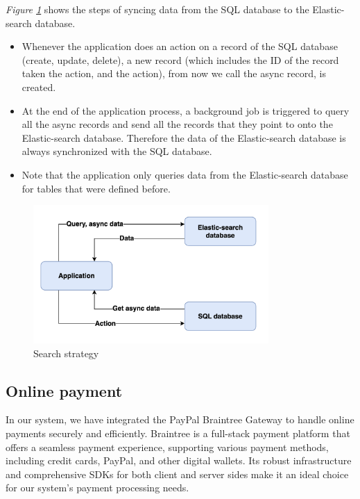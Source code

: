 \emph{Figure \ref{fig:search-strategy}} shows the steps of syncing data from the SQL database
to the Elastic-search database.

\begin{itemize}
    \item
          Whenever the application does an action on a record of the SQL
          database (create, update, delete), a new record (which includes the ID
          of the record taken the action, and the action), from now we call the
          async record, is created.
    \item
          At the end of the application process, a background job is triggered
          to query all the async records and send all the records that they
          point to onto the Elastic-search database. Therefore the data of the
          Elastic-search database is always synchronized with the SQL database.
    \item
          Note that the application only queries data from the Elastic-search
          database for tables that were defined before.
\end{itemize}

\begin{figure}[H]
    \centering
    \includegraphics[width=0.8\textwidth]{Figures/search_strat.png}
    \caption{Search strategy}
    \label{fig:search-strategy}
\end{figure}

\subsection{Online payment}

In our system, we have integrated the PayPal Braintree Gateway to handle online payments securely and efficiently. Braintree is a full-stack payment platform that offers a seamless payment experience, supporting various payment methods, including credit cards, PayPal, and other digital wallets. Its robust infrastructure and comprehensive SDKs for both client and server sides make it an ideal choice for our system's payment processing needs.


